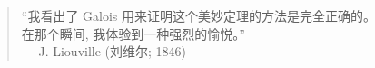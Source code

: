 \begin{frame}

  \begin{center}
  \end{center}
\end{frame}

\begin{frame}
  \begin{quote}
  \begin{center}
    ``我看出了 Galois 用来证明这个美妙定理的方法是完全正确的。\\[8pt]
    在那个瞬间, 我体验到一种强烈的愉悦。'' \\[15pt]

    \hfill --- J. Liouville (刘维尔; 1846)
  \end{center}
\end{quote}
\end{frame}
